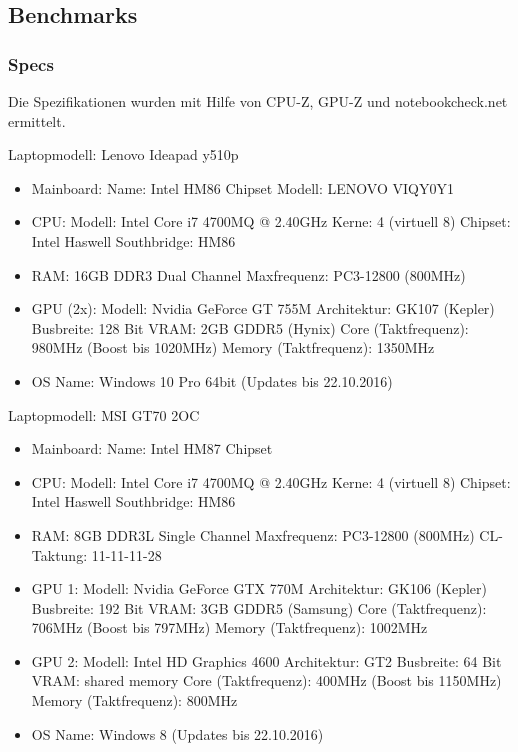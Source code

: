 \subsection{Benchmarks}
\subsubsection{Specs}
Die Spezifikationen wurden mit Hilfe von CPU-Z, GPU-Z und notebookcheck.net ermittelt.\\
\cite{CPUZ} \cite{GPUZ} \cite{Notebookcheck}

Laptopmodell: Lenovo Ideapad y510p
\begin{itemize}
	\item Mainboard:
	\subitem Name: Intel HM86 Chipset
	\subitem Modell: LENOVO VIQY0Y1
	\item CPU:
	\subitem Modell: Intel Core i7 4700MQ @ 2.40GHz
	\subitem Kerne: 4 (virtuell 8)
	\subitem Chipset: Intel Haswell
	\subitem Southbridge: HM86
	\item RAM:
	\subitem 16GB DDR3
	\subitem Dual Channel
	\subitem Maxfrequenz: PC3-12800 (800MHz)
	\item GPU (2x):
	\subitem Modell: Nvidia GeForce GT 755M
	\subitem Architektur: GK107 (Kepler)
	\subitem Busbreite: 128 Bit
	\subitem VRAM: 2GB GDDR5 (Hynix)
	\subitem Core (Taktfrequenz): 980MHz (Boost bis 1020MHz)
	\subitem Memory (Taktfrequenz): 1350MHz
	\item OS
	\subitem Name: Windows 10 Pro 64bit (Updates bis 22.10.2016)	
\end{itemize}

Laptopmodell: MSI GT70 2OC
\begin{itemize}
	\item Mainboard:
	\subitem Name: Intel HM87 Chipset
	\item CPU:
	\subitem Modell: Intel Core i7 4700MQ @ 2.40GHz
	\subitem Kerne: 4 (virtuell 8)
	\subitem Chipset: Intel Haswell
	\subitem Southbridge: HM86
	\item RAM:
	\subitem 8GB DDR3L
	\subitem Single Channel
	\subitem Maxfrequenz: PC3-12800 (800MHz)
	\subitem CL-Taktung: 11-11-11-28
	\item GPU 1:
	\subitem Modell: Nvidia GeForce GTX 770M
	\subitem Architektur: GK106 (Kepler)
	\subitem Busbreite: 192 Bit
	\subitem VRAM: 3GB GDDR5 (Samsung)
	\subitem Core (Taktfrequenz): 706MHz (Boost bis 797MHz)
	\subitem Memory (Taktfrequenz): 1002MHz
	\item GPU 2:
	\subitem Modell: Intel HD Graphics 4600
	\subitem Architektur: GT2
	\subitem Busbreite: 64 Bit
	\subitem VRAM: shared memory
	\subitem Core (Taktfrequenz): 400MHz (Boost bis 1150MHz)
	\subitem Memory (Taktfrequenz): 800MHz
	\item OS
	\subitem Name: Windows 8 (Updates bis 22.10.2016)	
\end{itemize}


